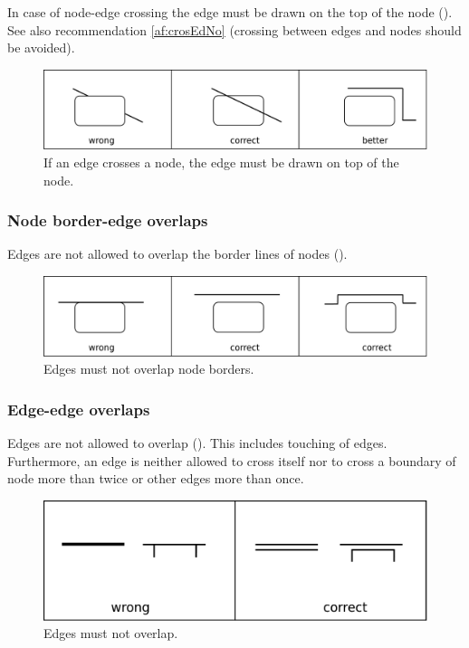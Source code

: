 In case of node-edge crossing the edge must be drawn on the top of
the node (). See also recommendation \ref{af:crosEdNo} (crossing between
edges and nodes should be avoided).

\begin{figure}[h!]
  \centering
  \includegraphics[scale=0.3]{images/layout-node-edge}
  \caption{If an edge crosses a node, the edge must be drawn on top
  of the node.}\label{fig:af:layout2}
\end{figure}

\subsubsection{Node border-edge overlaps}

Edges are not allowed to overlap the border lines of nodes ().

\begin{figure}[h!]
  \centering
  \includegraphics[scale=0.3]{images/layout-node-border-edge}
  \caption{Edges must not overlap node borders.}\label{fig:af:layout3}
\end{figure}

\subsubsection{Edge-edge overlaps}

Edges are not allowed to overlap (). This includes touching of edges.
Furthermore, an edge is neither allowed to cross itself nor to cross
a boundary of node more than twice or other edges more than once.

\begin{figure}[h!]
  \centering
  \includegraphics[scale=0.3]{images/layout-edge-edge}
  \caption{Edges must not overlap.}\label{fig:af:layout4}
\end{figure}

